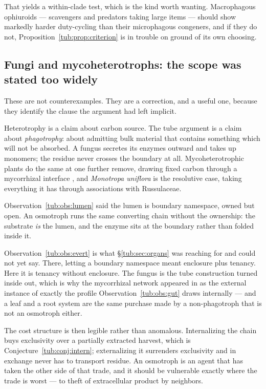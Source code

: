 That yields a within-clade test, which is the kind worth wanting. Macrophagous
ophiuroids --- scavengers and predators taking large items --- should show
markedly harder duty-cycling than their microphagous congeners, and if they do
not, Proposition~\ref{tub:prop:criterion} is in trouble on ground of its own
choosing.

\subsection{Fungi and mycoheterotrophs: the scope was stated too widely}

These are not counterexamples. They are a correction, and a useful one, because
they identify the clause the argument had left implicit.

Heterotrophy is a claim about carbon source. The tube argument is a claim about
\emph{phagotrophy}: about admitting bulk material that contains something which
will not be absorbed. A fungus secretes its enzymes outward and takes up
monomers; the residue never crosses the boundary at all. Mycoheterotrophic
plants do the same at one further remove, drawing fixed carbon through a
mycorrhizal interface \cite{leake1994,bidartondo2005}, and \emph{Monotropa
uniflora} is the resolutive case, taking everything it has through associations
with Russulaceae.

\begin{observation}
\label{tub:obs:evert}
Observation~\ref{tub:obs:lumen} said the lumen is boundary namespace, owned but
open. An osmotroph runs the same converting chain without the ownership: the
substrate \emph{is} the lumen, and the enzyme sits at the boundary rather than
folded inside it.
\end{observation}

Observation~\ref{tub:obs:evert} is what \S\ref{tub:sec:organs} was reaching for
and could not yet say. There, letting a boundary namespace meant enclosure plus
tenancy. Here it is tenancy without enclosure. The fungus is the tube
construction turned inside out, which is why the mycorrhizal network appeared in
\chEng as the external instance of exactly the profile
Observation~\ref{tub:obs:gut} draws internally --- and a leaf and a root system
are the same purchase made by a non-phagotroph that is not an osmotroph either.

The cost structure is then legible rather than anomalous. Internalizing the
chain buys exclusivity over a partially extracted harvest, which is
Conjecture~\ref{tub:conj:intern}; externalizing it surrenders exclusivity and in
exchange never has to transport residue. An osmotroph is an agent that has taken
the other side of that trade, and it should be vulnerable exactly where the
trade is worst --- to theft of extracellular product by neighbors.

